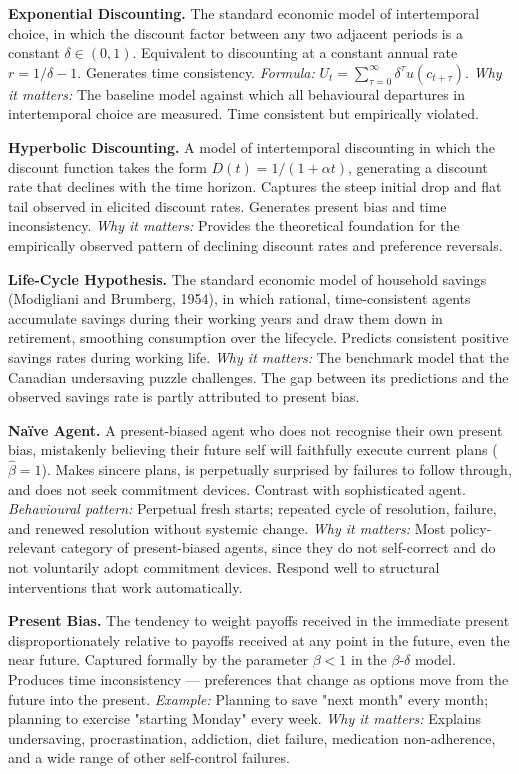 \documentclass[12pt, letterpaper]{article}
\begin{document}
\textbf{Exponential Discounting.} The standard economic model of intertemporal choice, in which the discount factor between any two adjacent periods is a constant $\delta \in (0,1)$. Equivalent to discounting at a constant annual rate $r = 1/\delta - 1$. Generates time consistency. \textit{Formula:} $U_t = \sum_{\tau=0}^{\infty} \delta^\tau u(c_{t+\tau})$. \textit{Why it matters:} The baseline model against which all behavioural departures in intertemporal choice are measured. Time consistent but empirically violated.

\textbf{Hyperbolic Discounting.} A model of intertemporal discounting in which the discount function takes the form $D(t) = 1/(1+\alpha t)$, generating a discount rate that declines with the time horizon. Captures the steep initial drop and flat tail observed in elicited discount rates. Generates present bias and time inconsistency. \textit{Why it matters:} Provides the theoretical foundation for the empirically observed pattern of declining discount rates and preference reversals.

\textbf{Life-Cycle Hypothesis.} The standard economic model of household savings (Modigliani and Brumberg, 1954), in which rational, time-consistent agents accumulate savings during their working years and draw them down in retirement, smoothing consumption over the lifecycle. Predicts consistent positive savings rates during working life. \textit{Why it matters:} The benchmark model that the Canadian undersaving puzzle challenges. The gap between its predictions and the observed savings rate is partly attributed to present bias.

\textbf{Naïve Agent.} A present-biased agent who does not recognise their own present bias, mistakenly believing their future self will faithfully execute current plans ($\hat{\beta} = 1$). Makes sincere plans, is perpetually surprised by failures to follow through, and does not seek commitment devices. Contrast with sophisticated agent. \textit{Behavioural pattern:} Perpetual fresh starts; repeated cycle of resolution, failure, and renewed resolution without systemic change. \textit{Why it matters:} Most policy-relevant category of present-biased agents, since they do not self-correct and do not voluntarily adopt commitment devices. Respond well to structural interventions that work automatically.

\textbf{Present Bias.} The tendency to weight payoffs received in the immediate present disproportionately relative to payoffs received at any point in the future, even the near future. Captured formally by the parameter $\beta < 1$ in the $\beta$-$\delta$ model. Produces time inconsistency --- preferences that change as options move from the future into the present. \textit{Example:} Planning to save "next month" every month; planning to exercise "starting Monday" every week. \textit{Why it matters:} Explains undersaving, procrastination, addiction, diet failure, medication non-adherence, and a wide range of other self-control failures.
\end{document}
